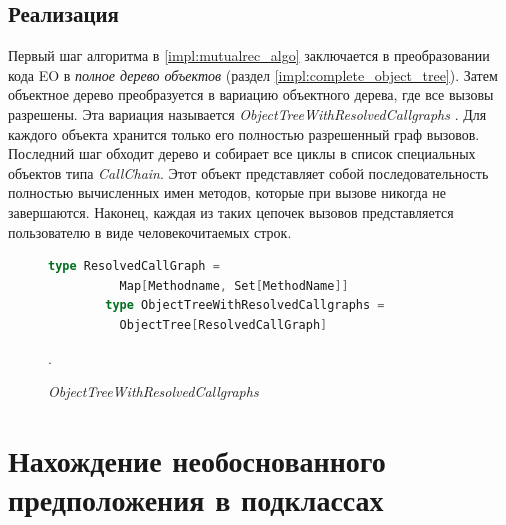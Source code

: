 \subsection{Реализация}
Первый шаг алгоритма в \ref{impl:mutualrec_algo} заключается в преобразовании кода EO в \textit{полное дерево объектов} (раздел \ref{impl:complete_object_tree}). Затем объектное дерево преобразуется в вариацию объектного дерева, где все вызовы разрешены. Эта вариация называется \textit{ObjectTreeWithResolvedCallgraphs} . Для каждого объекта хранится только его полностью разрешенный граф вызовов. Последний шаг обходит дерево и собирает все циклы в список специальных объектов типа \textit{CallChain}. Этот объект представляет собой последовательность полностью вычисленных имен методов, которые при вызове никогда не завершаются. Наконец, каждая из таких цепочек вызовов представляется пользователю в виде человекочитаемых строк. 

\begin{figure}
    \begin{lstlisting}[language=Scala]
        type ResolvedCallGraph = 
          Map[Methodname, Set[MethodName]]
        type ObjectTreeWithResolvedCallgraphs =
          ObjectTree[ResolvedCallGraph]
    \end{lstlisting}
    \caption{\textit{ObjectTreeWithResolvedCallgraphs}}.
    \label{fig:mutualrec_program}
\end{figure}

\section{Нахождение необоснованного предположения в подклассах}
\label{impl:unjustified}


